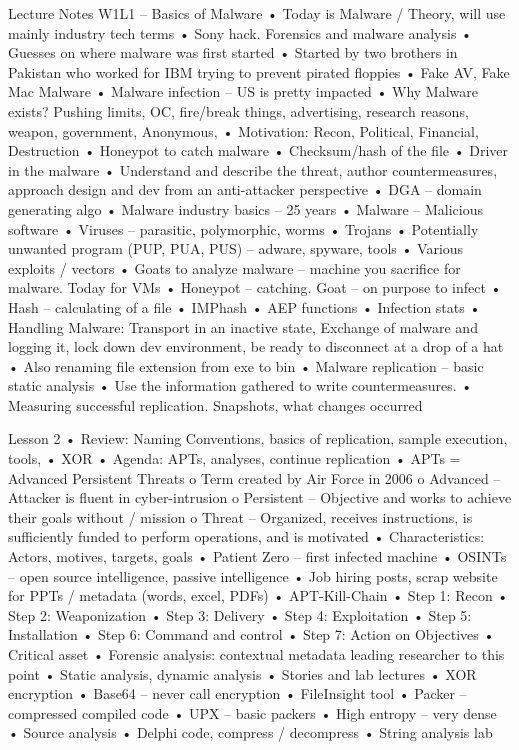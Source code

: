 \documentclass[12pt]{article}
\begin{document}
Lecture Notes
W1L1 – Basics of Malware
•	Today is Malware / Theory, will use mainly industry tech terms
•	Sony hack. Forensics and malware analysis
•	Guesses on where malware was first started
•	Started by two brothers in Pakistan who worked for IBM trying to prevent pirated floppies
•	Fake AV, Fake Mac Malware
•	Malware infection – US is pretty impacted
•	Why Malware exists? Pushing limits, OC, fire/break things, advertising, research reasons, weapon, government, Anonymous, 
•	Motivation: Recon, Political, Financial, Destruction
•	Honeypot to catch malware
•	Checksum/hash of the file
•	Driver in the malware
•	Understand and describe the threat, author countermeasures, approach design and dev from an anti-attacker perspective
•	DGA – domain generating algo
•	Malware industry basics – 25 years
•	Malware – Malicious software
•	Viruses – parasitic, polymorphic, worms
•	Trojans
•	Potentially unwanted program (PUP, PUA, PUS) – adware, spyware, tools
•	Various exploits / vectors
•	Goats to analyze malware – machine you sacrifice for malware. Today for VMs
•	Honeypot – catching. Goat – on purpose to infect
•	Hash – calculating of a file
•	IMPhash
•	AEP functions
•	Infection stats
•	Handling Malware: Transport in an inactive state, Exchange of malware and logging it, lock down dev environment, be ready to disconnect at a drop of a hat
•	Also renaming file extension from exe to bin
•	Malware replication – basic static analysis
•	Use the information gathered to write countermeasures. 
•	Measuring successful replication. Snapshots, what changes occurred

Lesson 2
•	Review: Naming Conventions, basics of replication, sample execution, tools, 
•	XOR
•	Agenda: APTs, analyses, continue replication
•	APTs = Advanced Persistent Threats
o	Term created by Air Force in 2006
o	Advanced – Attacker is fluent in cyber-intrusion
o	Persistent – Objective and works to achieve their goals without / mission
o	Threat – Organized, receives instructions, is sufficiently funded to perform operations, and is motivated
•	Characteristics: Actors, motives, targets, goals
•	Patient Zero – first infected machine
•	OSINTs – open source intelligence, passive intelligence
•	Job hiring posts, scrap website for PPTs / metadata (words, excel, PDFs)
•	APT-Kill-Chain
•	Step 1: Recon
•	Step 2: Weaponization
•	Step 3: Delivery
•	Step 4: Exploitation
•	Step 5: Installation
•	Step 6: Command and control
•	Step 7: Action on Objectives
•	Critical asset 
•	Forensic analysis: contextual metadata leading researcher to this point
•	Static analysis, dynamic analysis
•	Stories and lab lectures
•	XOR encryption
•	Base64 – never call encryption
•	FileInsight tool
•	Packer – compressed compiled code
•	UPX – basic packers
•	High entropy – very dense
•	Source analysis
•	Delphi code, compress / decompress
•	String analysis lab

 
\end{document}
